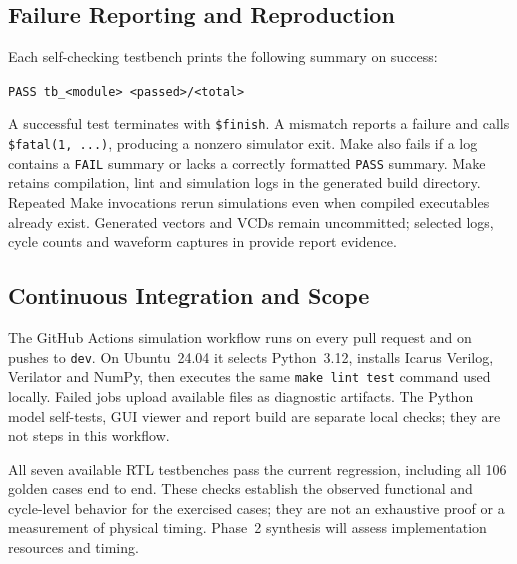 \subsection{Failure Reporting and Reproduction}
Each self-checking testbench prints the following summary on success:
\begin{center}
\small\verb|PASS tb_<module> <passed>/<total>|
\end{center}
A successful test terminates with \verb|$finish|. A mismatch reports a
failure and calls
\verb|$fatal(1, ...)|, producing a nonzero simulator exit. Make also fails
if a log contains a \texttt{FAIL} summary or lacks a correctly formatted
\texttt{PASS} summary. Make retains compilation, lint and simulation logs in the
generated build directory. Repeated Make invocations rerun simulations even when
compiled executables already exist. Generated vectors and VCDs remain
uncommitted; selected logs, cycle counts and waveform captures in
 provide report evidence.

\subsection{Continuous Integration and Scope}
The GitHub Actions simulation workflow runs on every pull request and on
pushes to \texttt{dev}. On Ubuntu~24.04 it selects Python~3.12, installs
Icarus Verilog, Verilator and NumPy, then executes the same
\texttt{make lint test} command used locally. Failed jobs upload available
 files as diagnostic artifacts. The Python model
self-tests, GUI viewer and report build are separate local checks; they
are not steps in this workflow.

All seven available RTL testbenches pass the current regression,
including all 106 golden cases end to end. These checks establish the
observed functional and cycle-level behavior for the exercised cases;
they are not an exhaustive proof or a measurement of physical timing.
Phase~2 synthesis will assess implementation resources and timing.
